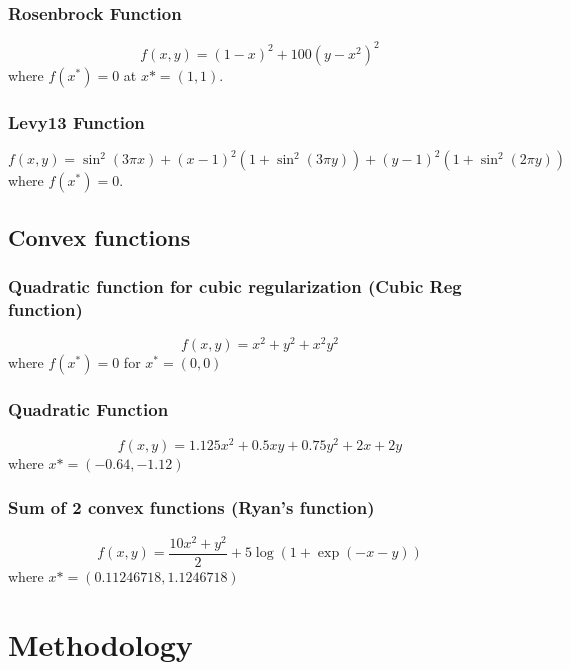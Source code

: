 \documentclass{article}
\begin{document}
\subsubsection{Rosenbrock Function}
\begin{equation}
f(x,y) = (1-x)^2 + 100(y-x^2)^2
\end{equation}
where $f(x^*)=0$ at $x*=(1,1)$.

\subsubsection{Levy13 Function}
\begin{equation}
f(x,y) = \sin^2(3\pi x) + (x-1)^2\left(1+\sin^2(3\pi y)\right) + (y-1)^2\left(1+\sin^2(2\pi y)\right)
\end{equation}
where $f(x^*)=0$.

\subsection{Convex functions}

\subsubsection{Quadratic function for cubic regularization (Cubic Reg function)}
\begin{equation}
f(x,y) = x^2 +y^2 + x^2y^2
\end{equation}
where $f(x^*) = 0$ for $x^* = (0,0)$

\subsubsection{Quadratic Function}
\begin{equation}
f(x,y) = 1.125x^2 + 0.5xy + 0.75y^2 + 2x + 2y
\end{equation}
where $x* = (-0.64,-1.12)$

\subsubsection{Sum of 2 convex functions (Ryan's function)}
\begin{equation}
f(x,y) = \frac{10x^2 + y^2}{2} + 5\log(1+\exp(-x-y))
\end{equation}
where $x* = (0.11246718,1.1246718)$



\section{Methodology}\label{experiments}
\end{document}
